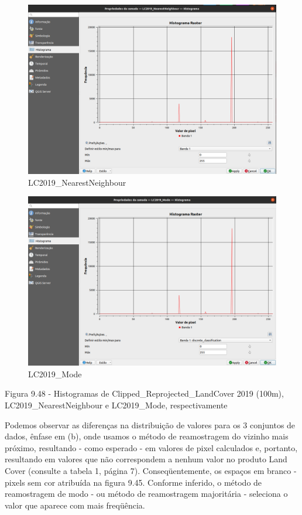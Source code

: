 \documentclass[
]{krantz}
\begin{document}
\begin{figure}
\centering
\includegraphics{media/modulo9/fig948_b.png}
\caption{LC2019\_NearestNeighbour}
\end{figure}

\begin{figure}
\centering
\includegraphics{media/modulo9/fig948_c.png}
\caption{LC2019\_Mode}
\end{figure}

Figura 9.48 - Histogramas de Clipped\_Reprojected\_LandCover 2019 (100m), LC2019\_NearestNeighbour e LC2019\_Mode, respectivamente

Podemos observar as diferenças na distribuição de valores para os 3 conjuntos de dados, ênfase em (b), onde usamos o método de reamostragem do vizinho mais próximo, resultando - como esperado - em valores de pixel calculados e, portanto, resultando em valores que não correspondem a nenhum valor no produto Land Cover (consulte a tabela 1, página 7). Conseqüentemente, os espaços em branco - pixels sem cor atribuída na figura 9.45. Conforme inferido, o método de reamostragem de modo - ou método de reamostragem majoritária - seleciona o valor que aparece com mais freqüência.
\end{document}
